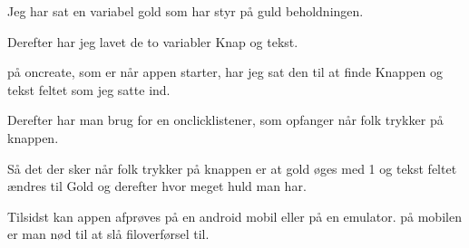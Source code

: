 Jeg har sat en variabel gold som har styr på guld beholdningen. 

Derefter har jeg lavet de to variabler Knap og tekst. 

på oncreate, som er når appen starter, har jeg sat den til at finde Knappen og tekst feltet som jeg satte ind. 

Derefter har man brug for en onclicklistener, som opfanger når folk trykker på knappen. 

Så det der sker når folk trykker på knappen er at gold øges med 1 og tekst feltet ændres til Gold og derefter hvor meget huld man har. 

Tilsidst kan appen afprøves på en android mobil eller på en emulator. på mobilen er man nød til at slå filoverførsel til. 







